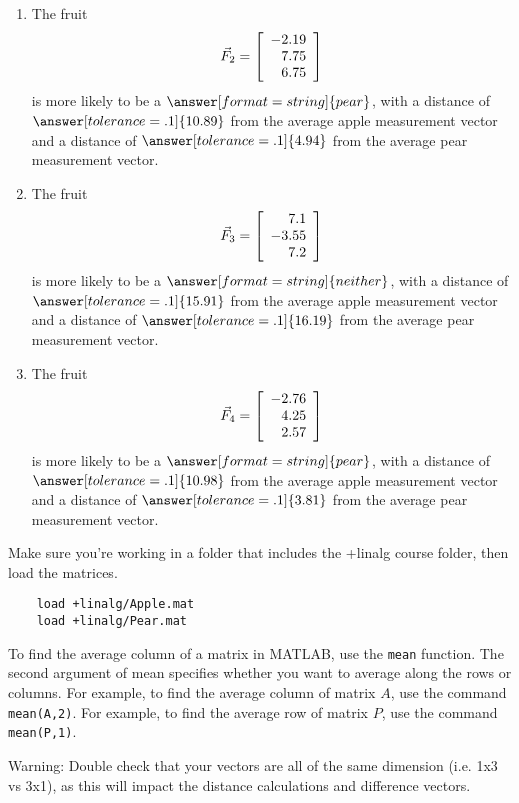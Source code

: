 \documentclass{ximera}
\begin{document}
\begin{problem}
\begin{enumerate}
\item
The fruit
\begin{equation*}
  \vec{F}_2=\startmat{r}
    -2.19 \\
    7.75 \\
    6.75
  \stopmat
\end{equation*}
is more likely to be a $\answer[format=string]{pear}$, with a distance of $\answer[tolerance=.1]{10.89}$ from the average apple measurement vector and a distance of $\answer[tolerance=.1]{4.94}$ from the average pear measurement vector.

\item
The fruit
\begin{equation*}
  \vec{F}_3=\startmat{r}
    7.1 \\
    -3.55 \\
    7.2
  \stopmat
\end{equation*}
is more likely to be a $\answer[format=string]{neither}$, with a distance of $\answer[tolerance=.1]{15.91}$ from the average apple measurement vector and a distance of $\answer[tolerance=.1]{16.19}$ from the average pear measurement vector.

\item
The fruit
\begin{equation*}
  \vec{F}_4=\startmat{r}
    -2.76 \\
    4.25 \\
    2.57
  \stopmat
\end{equation*}
is more likely to be a $\answer[format=string]{pear}$, with a distance of $\answer[tolerance=.1]{10.98}$ from the average apple measurement vector and a distance of $\answer[tolerance=.1]{3.81}$ from the average pear measurement vector.

\end{enumerate}

\begin{hint}

  Make sure you're working in a folder that includes the +linalg course folder, then load the matrices.
  \begin{verbatim}
    load +linalg/Apple.mat
    load +linalg/Pear.mat
  \end{verbatim}

  To find the average column of a matrix in MATLAB, use the \texttt{mean} function. The second argument of mean specifies whether you want to average along the rows or columns. For example, to find the average column of matrix $A$, use the command \texttt{mean(A,2)}. For example, to find the average row of matrix $P$, use the command \texttt{mean(P,1)}.

  Warning: Double check that your vectors are all of the same dimension (i.e. 1x3 vs 3x1), as this will impact the distance calculations and difference vectors.

\end{hint}

  
\end{problem}
\end{document}
